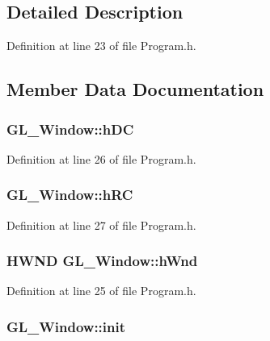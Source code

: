 \subsection{Detailed Description}


Definition at line 23 of file Program.\+h.



\subsection{Member Data Documentation}
\hypertarget{struct_g_l___window_ac968ec84163d9ff1818a6c7ca6f636ab}{
\subsubsection[{h\+D\+C}]{ G\+L\+\_\+\+Window\+::h\+D\+C}}\label{struct_g_l___window_ac968ec84163d9ff1818a6c7ca6f636ab}


Definition at line 26 of file Program.\+h.

\hypertarget{struct_g_l___window_a529cfea8e49780d88eb095ff56e4bc5e}{
\subsubsection[{h\+R\+C}]{ G\+L\+\_\+\+Window\+::h\+R\+C}}\label{struct_g_l___window_a529cfea8e49780d88eb095ff56e4bc5e}


Definition at line 27 of file Program.\+h.

\hypertarget{struct_g_l___window_a43e3e57bd7ba1d1e98a8bea7b1ca5bfa}{
\subsubsection[{h\+Wnd}]{\setlength{\rightskip}{0pt plus 5cm}H\+W\+N\+D G\+L\+\_\+\+Window\+::h\+Wnd}}\label{struct_g_l___window_a43e3e57bd7ba1d1e98a8bea7b1ca5bfa}


Definition at line 25 of file Program.\+h.

\hypertarget{struct_g_l___window_a509808116a84e361e12666b2d5b5c62f}{
\subsubsection[{init}]{ G\+L\+\_\+\+Window\+::init}}\label{struct_g_l___window_a509808116a84e361e12666b2d5b5c62f}


